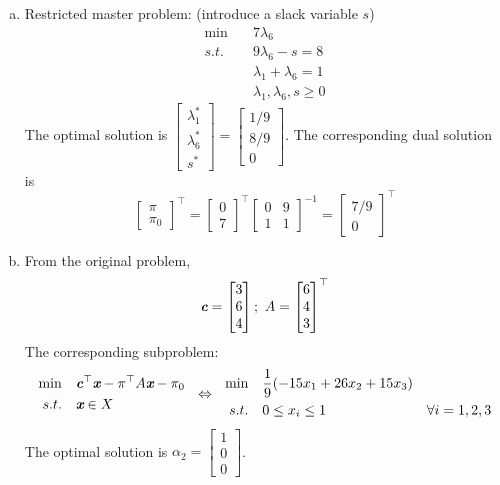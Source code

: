 \begin{enumerate}
\begin{enumerate}[(a)]
		\item Restricted master problem: (introduce a slack variable $s$)
		\begin{align*}
		\min \quad &7\lambda_6\\
		s.t. \quad &9\lambda_6-s= 8\\
		&\lambda_1+\lambda_6=1\\
		&\lambda_1,\lambda_6,s \ge 0
		\end{align*}
		The optimal solution is $\begin{bmatrix}
		\lambda_1^*\\\lambda_6^*\\s^* 
		\end{bmatrix} = \begin{bmatrix}
		1/9\\8/9\\0
		\end{bmatrix}$. The corresponding dual solution is $$\begin{bmatrix}
		\pi\\\pi_0
		\end{bmatrix}^\top = \begin{bmatrix}
		0\\7
		\end{bmatrix}^\top \begin{bmatrix}
		0 & 9\\1 & 1
		\end{bmatrix}^{-1} = \begin{bmatrix}
		7/9\\0
		\end{bmatrix}^\top$$
		\newpage
		\item From the original problem, $$
		\textit{\textbf{c}} = \begin{bmatrix}
		3\\6\\4
		\end{bmatrix};~A=\begin{bmatrix}
		6 \\ 4 \\3
		\end{bmatrix}^\top$$
		The corresponding subproblem:
		\[
		\begin{aligned}
		\min \quad &\textit{\textbf{c}}^\top \textit{\textbf{x}} - \pi^\top A\textit{\textbf{x}} -\pi_0\\
		s.t. \quad &\textit{\textbf{x}} \in X
		\end{aligned} ~~\Leftrightarrow~~ \begin{aligned}
		\min \quad &\dfrac{1}{9}(-15x_1+26x_2+15x_3)\\
		s.t.\quad & 0\le x_i\le 1&\forall i=1,2,3
		\end{aligned}
		\]
		The optimal solution is $\alpha_2 =\begin{bmatrix}
		1\\0 \\ 0
		\end{bmatrix}$.
		

\end{enumerate}
\end{enumerate}

